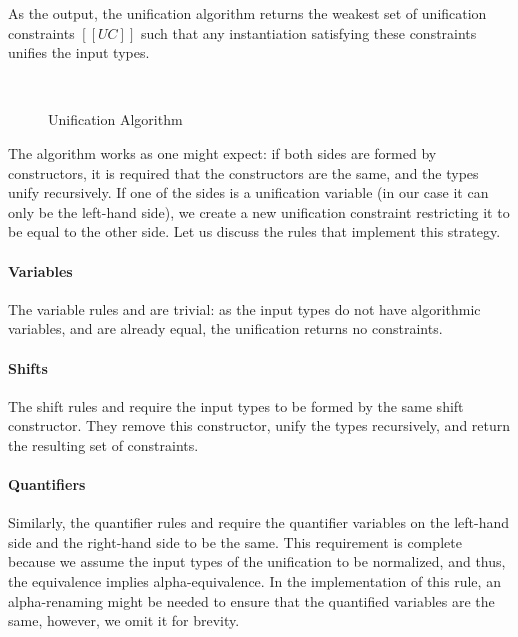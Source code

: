 As the output, the unification algorithm returns the weakest
set of unification constraints $[[UC]]$ such that any instantiation 
satisfying these constraints unifies the input types.

\begin{figure}[h]
  \hfill
  \begin{multicols}{2}
  \ottdefnUNUnifLabeled{}
  \columnbreak\\
  \ottdefnUPUnifLabeled{}
  \end{multicols}
  \caption{Unification Algorithm}
  \label{fig:unification}
\end{figure}

The algorithm works as one might expect:
if both sides are formed by constructors, 
it is required that the constructors are the same, and the
types unify recursively. If one of the sides
is a unification variable (in our case it can only be the left-hand side),
we create a new unification constraint restricting it to be equal to the other side.
Let us discuss the rules that implement this strategy. 

\paragraph{Variables}
  The variable rules  and 
  are trivial: as the input types do not have algorithmic variables, and are already equal, 
  the unification returns no constraints.

\paragraph{Shifts}
  The shift rules  and 
  require the input types to be formed by the same shift constructor. 
  They remove this constructor, unify the types recursively, and return the resulting
  set of constraints.

\paragraph{Quantifiers} 
  Similarly, the quantifier rules  and 
  require the quantifier variables on the left-hand side and the right-hand side to be the same.
  This requirement is complete because we assume the input types of the unification 
  to be normalized, and thus, the equivalence implies alpha-equivalence. 
  In the implementation of this rule, an alpha-renaming might be needed to ensure 
  that the quantified variables are the same, however, we omit it for brevity.

